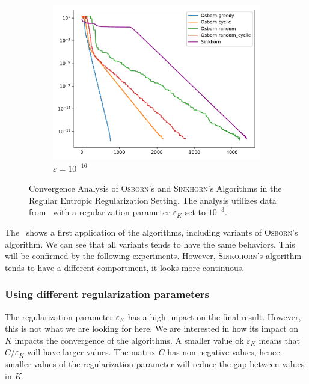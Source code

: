 \begin{figure}[H]
\begin{subfigure}[b]{.18\textwidth}
        \includegraphics[width=\textwidth]{figures/dist2_0.001/osborn_vs_sinkhorn_dist2_0.001_1e-16}
        \caption{\(\varepsilon = 10^{-16}\)}
    \end{subfigure}
    \caption{Convergence Analysis of \textsc{Osborn}'s and \textsc{Sinkhorn}'s Algorithms in the Regular Entropic Regularization Setting. The analysis utilizes data from~ with a regularization parameter \(\varepsilon_K\) set to \(10^{-3}\).}\label{fig:firstkernel}
\end{figure}

The~ shows a first application of the algorithms, including variants of \textsc{Osborn}'s algorithm. We can see that all variants tends to have the same behaviors. This will be confirmed by the following experiments. However, \textsc{Sinkohorn}'s algorithm tends to have a different comportment, it looks more continuous.


\subsubsection{Using different regularization parameters}

The regularization parameter \(\varepsilon_K\) has a high impact on the final result. However, this is not what we are looking for here. We are interested in how its impact on \(K\) impacts the convergence of the algorithms. A smaller value ok \(\varepsilon_K\) means that \(C/\varepsilon_K\) will have larger values. The matrix \(C\) has non-negative values, hence smaller values of the regularization parameter will reduce the gap between values in \(K\).

